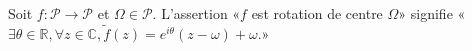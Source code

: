 Soit $f:\mathcal P\to \mathcal P$ et $\Omega\in\mathcal P$. L'assertion «$f$ est rotation de centre $\Omega$» signifie «$\exists \theta\in\mathbb R, \forall z\in\mathbb C, \tilde f(z)=e^{i\theta}(z-\omega)+\omega$.»

\begin{reponses}
\end{reponses}

